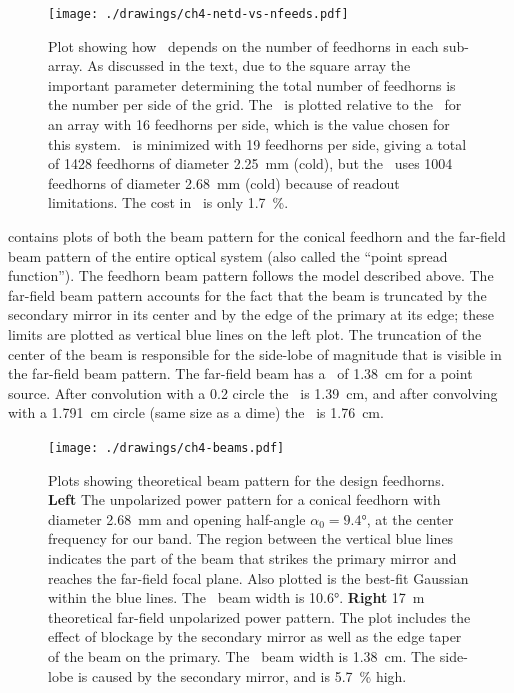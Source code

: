 \begin{figure}
\centering
\texttt{[image: ./drawings/ch4-netd-vs-nfeeds.pdf]}
\caption[\NETD\ vs number of detectors]{
  Plot showing how \NETD\ depends on the number of feedhorns in each sub-array.
  As discussed in the text, due to the square array the important parameter determining the total number of feedhorns is the number per side of the grid.
  The \NETD\ is plotted relative to the \NETD\ for an array with 16 feedhorns per side, which is the value chosen for this system.
  \NETD\ is minimized with 19 feedhorns per side, giving a total of 1428 feedhorns of diameter \SI{2.25}{\mm} (cold), but the \Imager\ uses 1004 feedhorns of diameter \SI{2.68}{\mm} (cold) because of readout limitations.
  The cost in \NETD\ is only \SI{1.7}{\percent}.
}
\label{fig:ch4-netd-vs-nfeeds}
\end{figure}


 contains plots of both the beam pattern for the conical feedhorn and the far-field beam pattern of the entire optical system (also called the ``point spread function'').
The feedhorn beam pattern follows the model described above.
The far-field beam pattern accounts for the fact that the beam is truncated by the secondary mirror in its center and by the edge of the primary at its edge; these limits are plotted as vertical blue lines on the left plot.
The truncation of the center of the beam is responsible for the side-lobe of magnitude  that is visible in the far-field beam pattern.
The far-field beam has a \FWHM\ of \SI{1.38}{\cm} for a point source.
After convolution with a \SI{0.2}{\in} circle the \FWHM\ is \SI{1.39}{\cm}, and after convolving with a \SI{1.791}{\cm} circle (same size as a dime) the \FWHM\ is \SI{1.76}{\cm}.

\begin{figure}
\centering
\texttt{[image: ./drawings/ch4-beams.pdf]}
\caption[Beam patterns]{
  Plots showing theoretical beam pattern for the design feedhorns.
  \textbf{Left} The unpolarized power pattern for a conical feedhorn with diameter \SI{2.68}{\mm} and opening half-angle $\alpha_0 = \ang{9.4}$, at the center frequency for our band.
  The region between the vertical blue lines indicates the part of the beam that strikes the primary mirror and reaches the far-field focal plane.
  Also plotted is the best-fit Gaussian within the blue lines.
  The \FWHM\ beam width is \ang{10.6}.
  \textbf{Right} \SI{17}{\m} theoretical far-field unpolarized power pattern.
  The plot includes the effect of blockage by the secondary mirror as well as the edge taper of the beam on the primary.
  The \FWHM\ beam width is \SI{1.38}{\cm}.
  The side-lobe is caused by the secondary mirror, and is \SI{5.7}{\percent} high.
}
\label{fig:ch4-beams}
\end{figure}

